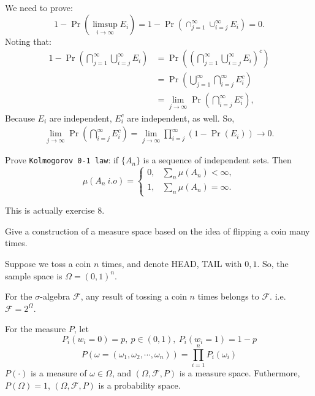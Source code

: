 \documentclass[12pt]{article}
\newenvironment{exercise}[1]{\begin{tcolorbox}[colback=black!15, colframe=black!80, breakable, title=#1]}{\end{tcolorbox}}
\newenvironment{solution}{\begin{tcolorbox}[colback=white, colframe=black!50, breakable, title=Solution. ]\setlength{\parskip}{0.8em}}{\end{tcolorbox}}
\begin{document}
\begin{solution}
        We need to prove: 
        \[
            1 - \Pr (\limsup_{i \to \infty} E_i)=1-\Pr(\cap_{j=1}^\infty\cup_{i=j}^\infty E_i) = 0. 
        \]
        Noting that: 
        \[
            \begin{aligned}
                1-\Pr\left(\bigcap_{j=1}^\infty\bigcup_{i=j}^\infty E_i\right)
                &=\Pr \left(\left(\bigcap _{j=1}^{\infty }\bigcup _{i=j}^{\infty }E_{i}\right)^{c}\right)\\
                &=\Pr \left(\bigcup _{j=1}^{\infty }\bigcap _{i=j}^{\infty }E_{i}^{c}\right)\\
                &=\lim _{j\to \infty }\Pr \left(\bigcap _{i=j}^{\infty }E_{i}^{c}\right), 
            \end{aligned}
        \]
        Because $E_i$ are independent, $E_i^c$ are independent, as well. So, 
        \[
            \begin{aligned}
                \lim _{j\to \infty }\Pr \left(\bigcap _{i=j}^{\infty }E_{i}^{c}\right)=\lim_{j\to \infty }\prod_{i=j}^{\infty }(1-\Pr(E_i))\to 0. 
            \end{aligned}
        \]
        
    \end{solution}

    \begin{exercise}{9}
        Prove \texttt{Kolmogorov 0-1 law}: if $\{A_n\}$ is a sequence of independent sets. Then
        \[
            \mu(A_n\ i.o)=\begin{cases}
                0, & \sum_{n}\mu(A_n)<\infty, \\
                1, & \sum_{n}\mu(A_n)=\infty. 
            \end{cases}
        \]
    \end{exercise}
    \begin{solution}
        This is actually exercise 8. 
    \end{solution}

    \begin{exercise}{10}
        Give a construction of a measure space based on the idea of flipping a coin many times. 
    \end{exercise}

    \begin{solution}
        Suppose we toss a coin $n$ times, and denote HEAD, TAIL with $0,1$. So, the sample space is $\Omega=(0,1)^n$. 

        For the $\sigma$-algebra $\mathscr{F}$, any result of tossing a coin $n$ times belongs to $\mathscr{F}$. i.e. $\mathscr{F}=2^\Omega$. 

        For the measure $P$, let 
        \[P_i(w_i=0)=p,\ p\in(0,1),\ P_i(w_i=1)=1-p\]
        \[P(\omega=(\omega_1,\omega_2,\cdots,\omega_n))=\prod_{i=1}^nP_i(\omega_i)\]
        $P(\cdot)$ is a measure of $\omega\in\Omega$, and $(\Omega, \mathscr{F}, P)$ is a measure space. Futhermore, $P(\Omega)=1$, $(\Omega, \mathscr{F}, P)$ is a probability space. 
    \end{solution}

\end{document}
